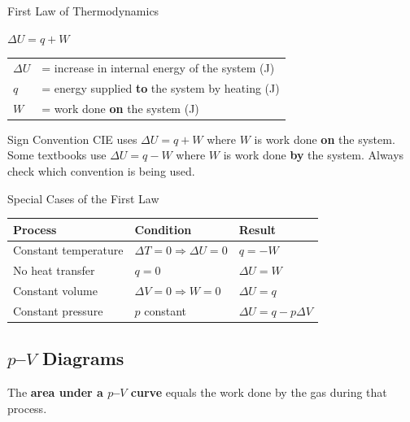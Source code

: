 \begin{formulabox}{First Law of Thermodynamics}
\begin{center}
\Large $\Delta U = q + W$
\end{center}
\vspace{0.3em}
\begin{tabular}{@{}ll@{}}
$\Delta U$ & = increase in internal energy of the system (J) \\
$q$ & = energy supplied \textbf{to} the system by heating (J) \\
$W$ & = work done \textbf{on} the system (J) \\
\end{tabular}
\end{formulabox}

\begin{warningbox}{Sign Convention}
CIE uses $\Delta U = q + W$ where $W$ is work done \textbf{on} the system. Some textbooks use $\Delta U = q - W$ where $W$ is work done \textbf{by} the system. Always check which convention is being used.
\end{warningbox}

\begin{keybox}{Special Cases of the First Law}
\renewcommand{\arraystretch}{1.4}
\begin{tabular}{@{}lll@{}}
\toprule
\textbf{Process} & \textbf{Condition} & \textbf{Result} \\
\midrule
Constant temperature & $\Delta T = 0 \Rightarrow \Delta U = 0$ & $q = -W$ \\
No heat transfer     & $q = 0$ & $\Delta U = W$ \\
Constant volume      & $\Delta V = 0 \Rightarrow W = 0$ & $\Delta U = q$ \\
Constant pressure    & $p$ constant & $\Delta U = q - p\Delta V$ \\
\bottomrule
\end{tabular}
\end{keybox}

\subsection{$p$--$V$ Diagrams}

The \textbf{area under a $p$--$V$ curve} equals the work done by the gas during that process.


